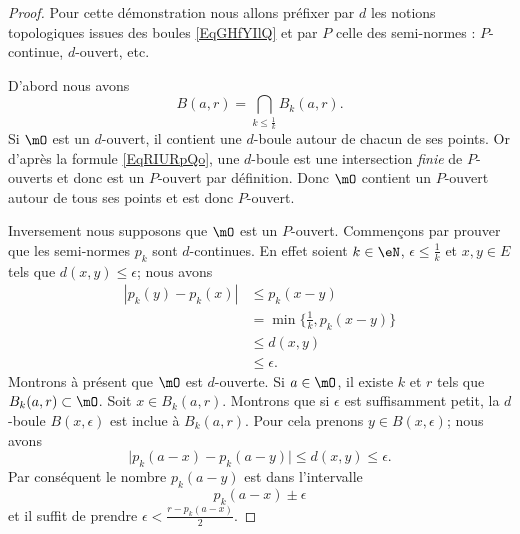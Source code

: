 \begin{proof}
    Pour cette démonstration nous allons préfixer par \( d\) les notions topologiques issues des boules \eqref{EqGHfYIlQ} et par \( P\) celle des semi-normes : \( P\)-continue, \( d\)-ouvert, etc.

    D'abord nous avons
    \begin{equation}    \label{EqRIURpQo}
        B(a,r)=\bigcap_{k\leq \frac{1}{ k }}B_k(a,r).
    \end{equation}
    Si \( \mO\) est un \( d\)-ouvert, il contient une \( d\)-boule autour de chacun de ses points. Or d'après la formule \eqref{EqRIURpQo}, une \( d\)-boule est une intersection \emph{finie} de \( P\)-ouverts et donc est un \( P\)-ouvert par définition. Donc \( \mO\) contient un \( P\)-ouvert autour de tous ses points et est donc \( P\)-ouvert.

    Inversement nous supposons que \( \mO\) est un \( P\)-ouvert. Commençons par prouver que les semi-normes \( p_k\) sont \( d\)-continues. En effet soient \( k\in \eN\), \( \epsilon\leq \frac{1}{ k }\) et \( x,y\in E\) tels que \( d(x,y)\leq \epsilon\); nous avons
    \begin{subequations}
        \begin{align}
            | p_k(y)-p_k(x) |&\leq p_k(x-y)\\
            &=\min\{ \frac{1}{ k },p_k(x-y) \}\\
            &\leq d(x,y)\\
            &\leq \epsilon.
        \end{align}
    \end{subequations}
    Montrons à présent que \( \mO\) est \( d\)-ouverte. Si \( a\in\mO\), il existe \( k\) et \( r\) tels que \( B_k(a,r)\subset\mO\). Soit \( x\in B_k(a,r)\). Montrons que si \( \epsilon\) est suffisamment petit, la \( d\)-boule \( B(x,\epsilon)\) est inclue à \( B_k(a,r)\). Pour cela prenons \( y\in B(x,\epsilon)\); nous avons
    \begin{equation}
        \big| p_k(a-x)-p_k(a-y) \big|\leq d(x,y)\leq \epsilon.
    \end{equation}
    Par conséquent le nombre \( p_k(a-y)\) est dans l'intervalle
    \begin{equation}
        p_k(a-x)\pm\epsilon
    \end{equation}
    et il suffit de prendre \( \epsilon<\frac{ r-p_k(a-x) }{2}\).
\end{proof}

